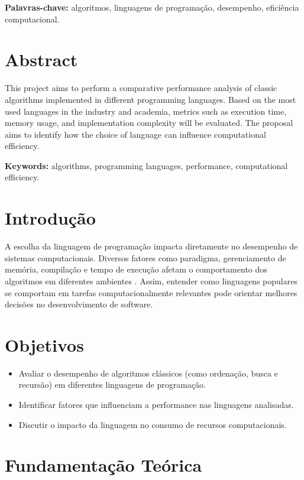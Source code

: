 \documentclass[12pt,oneside,a4paper]{report}
\begin{document}
\textbf{Palavras-chave:} algoritmos, linguagens de programação, desempenho, eficiência computacional.

\chapter*{Abstract}
This project aims to perform a comparative performance analysis of classic algorithms implemented in different programming languages. Based on the most used languages in the industry and academia, metrics such as execution time, memory usage, and implementation complexity will be evaluated. The proposal aims to identify how the choice of language can influence computational efficiency.

\textbf{Keywords:} algorithms, programming languages, performance, computational efficiency.

\tableofcontents

\chapter{Introdução}
A escolha da linguagem de programação impacta diretamente no desempenho de sistemas computacionais. Diversos fatores como paradigma, gerenciamento de memória, compilação e tempo de execução afetam o comportamento dos algoritmos em diferentes ambientes \cite{greenwade93}. Assim, entender como linguagens populares se comportam em tarefas computacionalmente relevantes pode orientar melhores decisões no desenvolvimento de software.

\chapter{Objetivos}
\begin{itemize}
    \item Avaliar o desempenho de algoritmos clássicos (como ordenação, busca e recursão) em diferentes linguagens de programação.
    \item Identificar fatores que influenciam a performance nas linguagens analisadas.
    \item Discutir o impacto da linguagem no consumo de recursos computacionais.
\end{itemize}

\chapter{Fundamentação Teórica}
\end{document}
